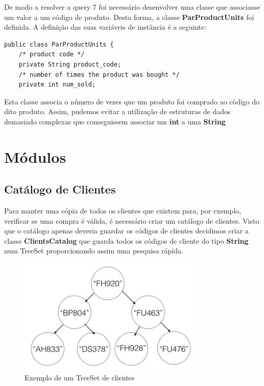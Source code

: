 \documentclass[10pt] {article}
\begin{document}
De modo a resolver a query 7 foi necessário desenvolver uma classe que associasse um valor a um código de produto.
Desta forma, a classe \color{blue} \textbf{ParProductUnits} \color{black} foi definida. A definição das suas variáveis de instância 
é a seguinte:

\begin{lstlisting}
public class ParProductUnits {
	/* product code */
    private String product_code;
    /* number of times the product was bought */
    private int num_sold;
\end{lstlisting}


Esta classe associa o número de vezes que um produto foi comprado ao código do dito produto.
Assim, pudemos evitar a utilização de estruturas de dados demasiado complexas que conseguissem associar um \textbf{int} a uma \color{blue} \textbf{String} \color{black}

\newpage
\section{Módulos}
\subsection{Catálogo de Clientes\label{catalogoclientes}}

Para manter uma cópia de todos os clientes que existem para, por exemplo, verificar se uma compra é válida, é necessário
criar um catálogo de clientes.
Visto que o catálogo apenas deveria guardar os códigos de clientes decidimos criar a classe \color{blue} \textbf{ClientsCatalog} 
\color{black} que guarda todos os códigos de cliente do tipo \color{blue} \textbf{String} \color{black} num TreeSet 
proporcionando assim uma pesquisa rápida.

\begin{figure}[ht!]
\centering
\includegraphics[width=90mm]{catclientes.png}
\caption{Exemplo de um TreeSet de clientes}
\end{figure}
\end{document}
